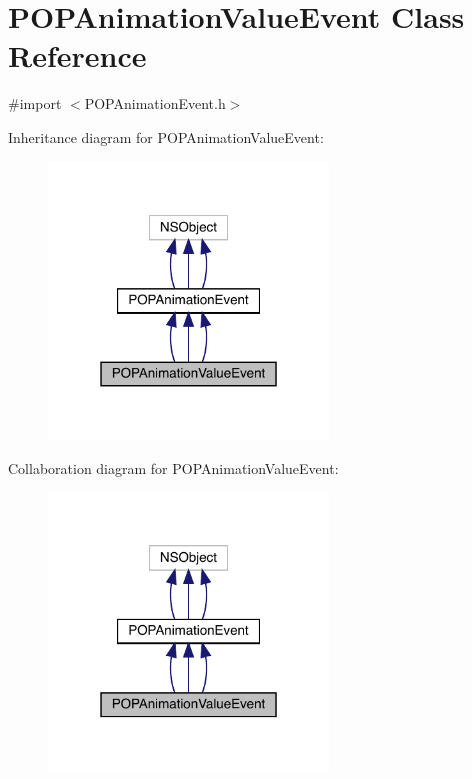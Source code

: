 \hypertarget{interface_p_o_p_animation_value_event}{}\section{P\+O\+P\+Animation\+Value\+Event Class Reference}
\label{interface_p_o_p_animation_value_event}


{\ttfamily \#import $<$P\+O\+P\+Animation\+Event.\+h$>$}



Inheritance diagram for P\+O\+P\+Animation\+Value\+Event\+:\nopagebreak
\begin{figure}[H]
\begin{center}
\leavevmode
\includegraphics[width=211pt]{interface_p_o_p_animation_value_event__inherit__graph}
\end{center}
\end{figure}


Collaboration diagram for P\+O\+P\+Animation\+Value\+Event\+:\nopagebreak
\begin{figure}[H]
\begin{center}
\leavevmode
\includegraphics[width=211pt]{interface_p_o_p_animation_value_event__coll__graph}
\end{center}
\end{figure}
